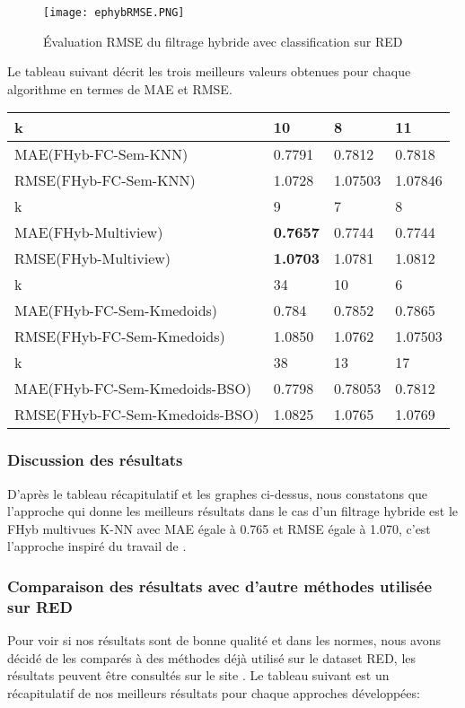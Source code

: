 \begin{figure}[H]
	\centering
	\texttt{[image: ephybRMSE.PNG]}
	\caption{Évaluation RMSE du filtrage hybride avec classification sur RED}
	\label{fig:ephybRMSE}
\end{figure}
Le tableau suivant décrit les trois meilleurs valeurs obtenues pour chaque algorithme en termes de MAE et RMSE.
\begin{table}[H]
	\centering
	\begin{tabular}{|l|l|l|l|}
		\hline
		k & 10 & 8 & 11 \\ \hline
		MAE(FHyb-FC-Sem-KNN) & 0.7791 & 0.7812 & 0.7818 \\ \hline
		RMSE(FHyb-FC-Sem-KNN) & 1.0728 & 1.07503 & 1.07846 \\ \hline\hline
		k & 9 & 7 & 8 \\ \hline
		MAE(FHyb-Multiview) & \textbf{0.7657}& 0.7744 & 0.7744 \\ \hline
		RMSE(FHyb-Multiview) & \textbf{1.0703}& 1.0781 & 1.0812\\ \hline\hline
		k & 34 & 10 & 6 \\ \hline
		MAE(FHyb-FC-Sem-Kmedoids) & 0.784 & 0.7852 & 0.7865 \\ \hline
		RMSE(FHyb-FC-Sem-Kmedoids) & 1.0850 & 1.0762 & 1.07503 \\ \hline\hline
		k & 38 & 13 & 17 \\ \hline
		MAE(FHyb-FC-Sem-Kmedoids-BSO) & 0.7798 & 0.78053 & 0.7812 \\ \hline
		RMSE(FHyb-FC-Sem-Kmedoids-BSO) & 1.0825 & 1.0765 & 1.0769 \\ \hline
	\end{tabular}
\end{table}

\subsubsection*{Discussion des résultats}
D'après le tableau récapitulatif et les graphes ci-dessus, nous constatons que l'approche qui donne les meilleurs résultats dans le cas d'un filtrage hybride est le FHyb multivues K-NN avec MAE égale à 0.765 et RMSE égale à 1.070, c'est l'approche inspiré du travail de \cite{ref30}.

\subsubsection*{Comparaison des résultats avec d'autre méthodes utilisée sur RED}
Pour voir si nos résultats sont de bonne qualité et dans les normes, nous avons décidé de les comparés à des méthodes déjà utilisé sur le dataset RED, les résultats peuvent être consultés sur le site \cite{ref43}.
Le tableau suivant est un récapitulatif de nos meilleurs résultats pour chaque approches développées:

